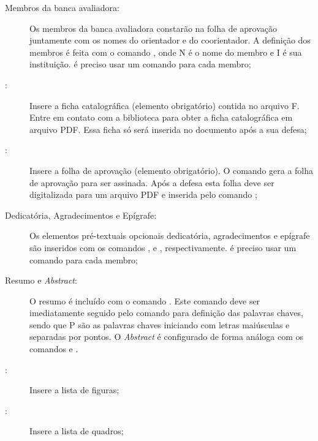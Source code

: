 \begin{description}
\item[Membros da banca avaliadora:] Os membros da banca avaliadora constarão na folha de aprovação juntamente com os nomes do orientador e do coorientador.
A definição dos membros é feita com o comando , onde N é o nome do membro e I é sua instituição.
é preciso usar um comando para cada membro;
\item[:] Insere a ficha catalográfica (elemento obrigatório) contida no arquivo F.
Entre em contato com a biblioteca para obter a ficha catalográfica em arquivo PDF.
Essa ficha só será inserida no documento após a sua defesa;
\item[:] Insere a folha de aprovação (elemento obrigatório).
O comando  gera a folha de aprovação para ser assinada.
Após a defesa esta folha deve ser digitalizada para um arquivo PDF e inserida pelo comando ;
\item[Dedicatória, Agradecimentos e Epígrafe:] Os elementos pré-textuais opcionais dedicatória, agradecimentos e epígrafe são inseridos com os comandos ,  e , respectivamente.
é preciso usar um comando para cada membro;
\item[Resumo e \textit{Abstract}:] O resumo é incluído com o comando . Este comando deve ser imediatamente seguido pelo comando  para definição das palavras chaves, sendo que P são as palavras chaves iniciando com letras maiúsculas e separadas por pontos. O \textit{Abstract} é configurado de forma análoga com os comandos  e .
\item[:] Insere a lista de figuras;
\item[:] Insere a lista de quadros;

\end{description}
